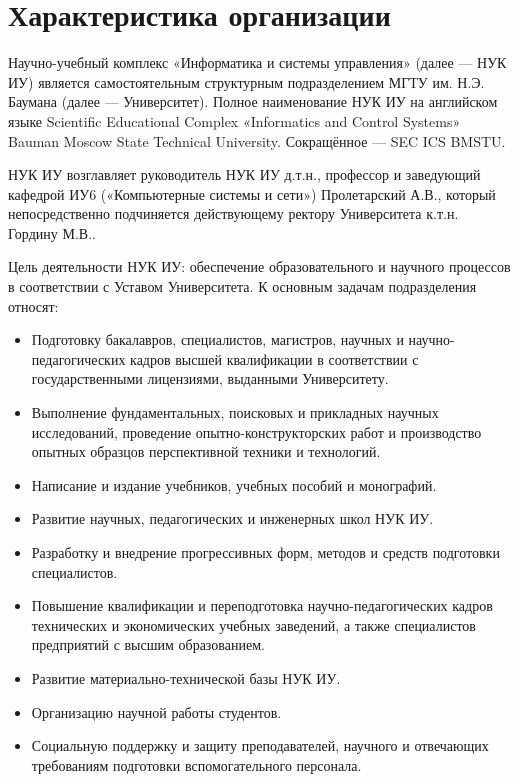 
\section{Характеристика организации}

Научно-учебный комплекс «Информатика и системы управления»
\cite{Requlations-SEC-ISC} (далее --- НУК ИУ) является самостоятельным
структурным подразделением МГТУ им. Н.Э. Баумана (далее --- Университет).
Полное наименование НУК ИУ на английском языке Scientific Educational Complex
«Informatics and Control Systems» Bauman Moscow State Technical University.
Сокращённое --- SEC ICS BMSTU.

НУК ИУ возглавляет руководитель НУК ИУ д.т.н., профессор и заведующий кафедрой
ИУ6 («Компьютерные системы и сети») Пролетарский А.В., который непосредственно
подчиняется действующему ректору Университета к.т.н. Гордину М.В..

Цель деятельности НУК ИУ: обеспечение образовательного и научного процессов в
соответствии с Уставом Университета. К основным задачам подразделения относят:

\begin{itemize}[leftmargin=0pt,itemindent=4.6em]
    \item Подготовку бакалавров, специалистов, магистров, научных и
научно-педагогических кадров высшей квалификации в соответствии с
государственными лицензиями, выданными Университету.

    \item Выполнение фундаментальных, поисковых и прикладных научных
исследований, проведение опытно-конструкторских работ и производство опытных
образцов перспективной техники и технологий.

    \item Написание и издание учебников, учебных пособий и монографий.

    \item Развитие научных, педагогических и инженерных школ НУК ИУ.

    \item Разработку и внедрение прогрессивных форм, методов и средств
подготовки специалистов.

    \item Повышение квалификации и переподготовка научно-педагогических кадров
технических и экономических учебных заведений, а также специалистов предприятий
с высшим образованием.

    \item Развитие материально-технической базы НУК ИУ.

    \item Организацию научной работы студентов.

    \item Социальную поддержку и защиту преподавателей, научного и отвечающих
требованиям подготовки вспомогательного персонала.
\end{itemize}
